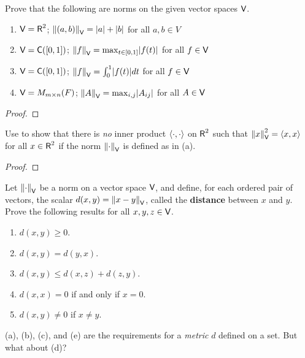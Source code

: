 \begin{exercise} \label{exercise 6.1.26}
Prove that the following are norms on the given vector spaces \(\textsf{V}\).
\begin{enumerate}
\item \(\textsf{V} = \textsf{R}^2\); \quad \(\left\lVert(a, b)\right\rVert_{\textsf{V}} = \lvert a\rvert + \lvert b\rvert\) for all \(a, b \in V\)
\item \(\textsf{V} = \textsf{C}([0, 1])\); \quad \(\left\lVert f\right\rVert_{\textsf{V}} = \max_{t \in [0, 1]} \lvert f(t)\rvert\) for all \(f \in \textsf{V}\)
\item \(\textsf{V} = \textsf{C}([0, 1])\); \(\left\lVert f\right\rVert_{\textsf{V}} = \int_0^1 \lvert f(t)\rvert dt\) for all \(f \in \textsf{V}\)
\item \(\textsf{V} = M_{m \times n}(F)\); \(\left\lVert A\right\rVert_{\textsf{V}} = \max_{i, j} \lvert A_{ij}\rvert\) for all \(A \in \textsf{V}\)
\end{enumerate}
\end{exercise}

\begin{proof}
\end{proof}

\begin{exercise} \label{exercise 6.1.27}
Use  to show that there is \emph{no} inner product \(\left< \cdot, \cdot \right>\) on \(\textsf{R}^2\) such that \(\left\lVert x\right\rVert_{\textsf{V}}^2 = \left< x, x \right>\) for all \(x \in \textsf{R}^2\) if the norm \(\left\lVert\cdot\right\rVert_{\textsf{V}}\) is defined as in (a).
\end{exercise}

\begin{proof}
\end{proof}

\begin{exercise} \label{exercise 6.1.28}
Let \(\left\lVert\cdot\right\rVert_{\textsf{V}}\) be a norm on a vector space \(\textsf{V}\), and define, for each ordered pair of vectors, the scalar \(d(x, y) = \left\lVert x - y\right\rVert_{\textsf{V}}\), called the \textbf{distance} between \(x\) and \(y\).
Prove the following results for all \(x, y, z \in \textsf{V}\).
\begin{enumerate}
\item \(d(x, y) \ge 0\).
\item \(d(x, y) = d(y, x)\).
\item \(d(x, y) \le d(x, z) + d(z, y)\).
\item \RED* \(d(x, x) = 0\) if and only if \(x = 0\).
\item \(d(x, y) \ne 0\) if \(x \ne y\).
\end{enumerate}
\end{exercise}

\begin{note}
(a), (b), (c), and (e) are the requirements for a \emph{metric} \(d\) defined on a set.
But what about (d)?
\end{note}

